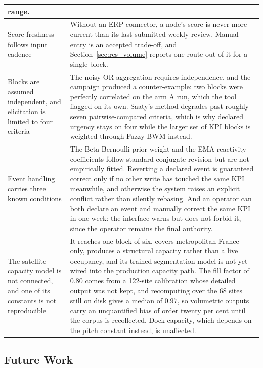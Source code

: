 \begin{longtable}{@{}>{\raggedright\arraybackslash}p{4.2cm} p{11.0cm}@{}}
range. \\[3pt]
\midrule
Score freshness follows input cadence & Without an ERP connector, a node's score is never more
current than its last submitted weekly review. Manual entry is an accepted trade-off, and
Section~\ref{sec:res_volume} reports one route out of it for a single block. \\[3pt]
\midrule
Blocks are assumed independent, and elicitation is limited to four criteria & The noisy-OR
aggregation requires independence, and the campaign produced a counter-example: two blocks
were perfectly correlated on the arm A run, which the tool flagged on its own. Saaty's method
degrades past roughly seven pairwise-compared criteria, which is why declared urgency stays on
four while the larger set of KPI blocks is weighted through Fuzzy BWM instead. \\[3pt]
\midrule
Event handling carries three known conditions & The Beta-Bernoulli prior weight and the EMA
reactivity coefficients follow standard conjugate revision but are not empirically fitted.
Reverting a declared event is guaranteed correct only if no other write has touched the same
KPI meanwhile, and otherwise the system raises an explicit conflict rather than silently
rebasing. And an operator can both declare an event and manually correct the same KPI in one
week: the interface warns but does not forbid it, since the operator remains the final
authority. \\[3pt]
\midrule
The satellite capacity model is not connected, and one of its constants is not reproducible &
It reaches one block of six, covers metropolitan France only, produces a structural capacity
rather than a live occupancy, and its trained segmentation model is not yet wired into the
production capacity path. The fill factor of $0.80$ comes from a 122-site calibration whose
detailed output was not kept, and recomputing over the 68 sites still on disk gives a median
of $0.97$, so volumetric outputs carry an unquantified bias of order twenty per cent until the
corpus is recollected. Dock capacity, which depends on the pitch constant instead, is
unaffected. \\
\end{longtable}
\endgroup

\subsection{Future Work}
\label{sec:future_work}

